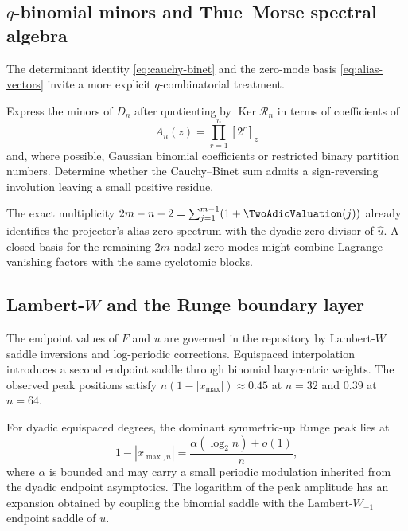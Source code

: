 \documentclass[11pt,oneside]{article}
\numberwithin{equation}{section}
\theoremstyle{definition}
\theoremstyle{remark}
\newcommand{\Ker}{\operatorname{Ker}}
\newcommand{\Synth}{\mathcal R}
\begin{document}
\subsection{\texorpdfstring{$q$}{q}-binomial minors and Thue--Morse spectral algebra}

The determinant identity \eqref{eq:cauchy-binet} and the zero-mode basis
\eqref{eq:alias-vectors} invite a more explicit $q$-combinatorial treatment.

\begin{problem}
Express the minors of $D_n$ after quotienting by $\Ker\Synth_n$ in terms of
coefficients of
\begin{equation}
 A_n(z)=\prod_{r=1}^{n}[2^r]_z
 \label{eq:A-repeat}
\end{equation}
and, where possible, Gaussian binomial coefficients or restricted binary
partition numbers.  Determine whether the Cauchy--Binet sum admits a
sign-reversing involution leaving a small positive residue.
\end{problem}

The exact multiplicity
$2m-n-2=\sum_{j=1}^{m-1}(1+\TwoAdicValuation(j))$ already identifies the projector's
alias zero spectrum with the dyadic zero divisor of $\widehat u$.  A closed
basis for the remaining $2m$ nodal-zero modes might combine Lagrange
vanishing factors with the same cyclotomic blocks.

\subsection{Lambert-\texorpdfstring{$W$}{W} and the Runge boundary layer}

The endpoint values of $F$ and $u$ are governed in the repository by
Lambert-$W$ saddle inversions and log-periodic corrections.  Equispaced
interpolation introduces a second endpoint saddle through binomial
barycentric weights.  The observed peak positions satisfy
$n(1-|x_{\max}|)\approx0.45$ at $n=32$ and $0.39$ at $n=64$.

\begin{conjecture}
\label{conj:Runge-layer}
For dyadic equispaced degrees, the dominant symmetric-up Runge peak lies at
\begin{equation}
 1-|x_{\max,n}|=\frac{\alpha(\log_2 n)+o(1)}{n},
 \label{eq:Runge-location-conj}
\end{equation}
where $\alpha$ is bounded and may carry a small periodic modulation inherited
from the dyadic endpoint asymptotics.  The logarithm of the peak amplitude
has an expansion obtained by coupling the binomial saddle with the
Lambert-$W_{-1}$ endpoint saddle of $u$.
\end{conjecture}
\end{document}

